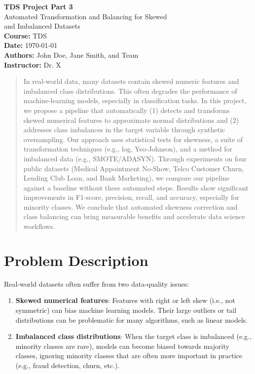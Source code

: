 \documentclass[11pt]{article}
\begin{document}
\begin{titlepage}
    \centering
    {\Large \textbf{TDS Project Part 3}}\\[1.5cm]
    {\Huge Automated Transformation and Balancing for Skewed \\
          and Imbalanced Datasets}\\[0.5cm]
    \vfill
    \textbf{Course: } TDS  \\
    \textbf{Date: } \today \\
    \vspace{1cm}
    \textbf{Authors: } John Doe, Jane Smith, and Team \\
    \vspace{0.4cm}
    \textbf{Instructor: } Dr. X
    \vfill
\end{titlepage}

\begin{abstract}
In real-world data, many datasets contain skewed numeric features and imbalanced class distributions. This often degrades the performance of machine-learning models, especially in classification tasks. In this project, we propose a pipeline that automatically (1) detects and transforms skewed numerical features to approximate normal distributions and (2) addresses class imbalances in the target variable through synthetic oversampling. Our approach uses statistical tests for skewness, a suite of transformation techniques (e.g., log, Yeo-Johnson), and a method for imbalanced data (e.g., SMOTE/ADASYN). Through experiments on four public datasets (Medical Appointment No-Show, Telco Customer Churn, Lending Club Loan, and Bank Marketing), we compare our pipeline against a baseline without these automated steps. Results show significant improvements in F1-score, precision, recall, and accuracy, especially for minority classes. We conclude that automated skewness correction and class balancing can bring measurable benefits and accelerate data science workflows.
\end{abstract}

\section{Problem Description}
Real-world datasets often suffer from two data-quality issues:
\begin{enumerate}
    \item \textbf{Skewed numerical features}:
    Features with right or left skew (i.e., not symmetric) can bias machine learning models. Their large outliers or tail distributions can be problematic for many algorithms, such as linear models.
    \item \textbf{Imbalanced class distributions}:
    When the target class is imbalanced (e.g., minority classes are rare), models can become biased towards majority classes, ignoring minority classes that are often more important in practice (e.g., fraud detection, churn, etc.).
\end{enumerate}
\end{document}
